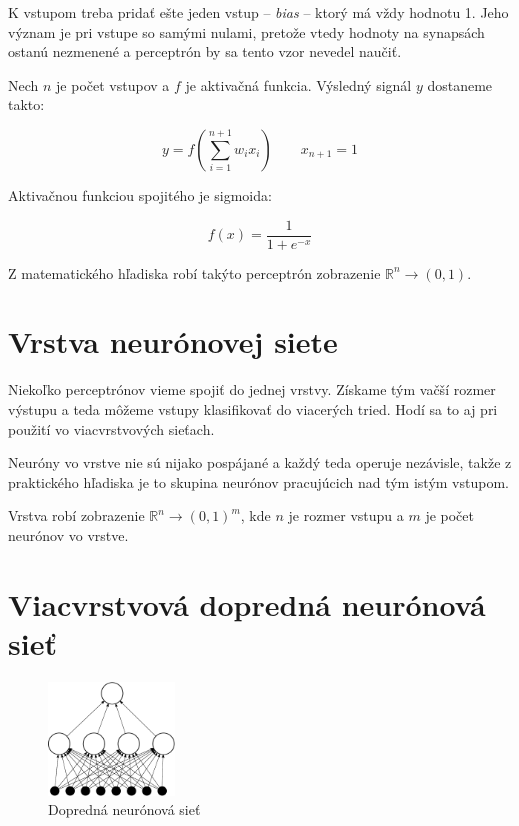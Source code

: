 K vstupom treba pridať ešte jeden vstup -- \textit{bias} -- ktorý má vždy hodnotu 1. Jeho význam je pri vstupe so samými nulami, pretože vtedy hodnoty na synapsách ostanú nezmenené a perceptrón by sa tento vzor nevedel naučiť.

Nech $n$ je počet vstupov a  $f$ je aktivačná funkcia. Výsledný signál $y$ dostaneme takto:

$$y= f\left(\sum_{i=1}^{n+1} w_i x_i \right)\qquad x_{n+1}=1$$\medskip

Aktivačnou funkciou spojitého je sigmoida: 

$$f(x) = \frac{1}{1+e^{-x}}$$\medskip

Z matematického hľadiska robí takýto perceptrón zobrazenie $\mathbb{R}^n\rightarrow (0,1)$.

\section{Vrstva neurónovej siete}

Niekoľko perceptrónov vieme spojiť do jednej vrstvy. Získame tým vačší rozmer výstupu a teda môžeme vstupy klasifikovať do viacerých tried. Hodí sa to aj pri použití vo viacvrstvových sieťach.

Neuróny vo vrstve nie sú nijako pospájané a každý teda operuje nezávisle, takže z praktického hľadiska je to skupina neurónov pracujúcich nad tým istým vstupom.

Vrstva robí zobrazenie $\mathbb{R}^n\rightarrow (0,1)^m$, kde $n$ je rozmer vstupu a $m$ je počet neurónov vo vrstve.

\section{Viacvrstvová dopredná neurónová sieť}

\begin{figure}[htbp]
  \begin{center}
    \includegraphics[width=0.3\textwidth]{images/ffnn}
  \end{center}
  \caption{Dopredná neurónová sieť}
  \label{fig:ffnn}
\end{figure}

